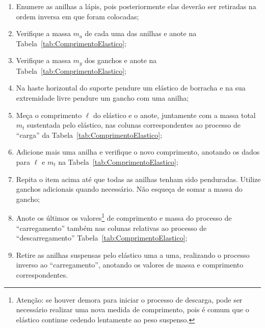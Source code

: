 \begin{enumerate}
    \item Enumere as anilhas a lápis, pois posteriormente elas deverão ser retiradas na ordem inversa em que foram colocadas;
	\item Verifique a massa $m_a$ de cada uma das anilhas e anote na Tabela~\ref{tab:ComprimentoElastico};
	\item Verifique a massa $m_g$ dos ganchos e anote na Tabela~\ref{tab:ComprimentoElastico};
	\item Na haste horizontal do suporte pendure um elástico de borracha e na sua extremidade livre pendure um gancho com uma anilha;
	\item Meça o comprimento $\ell$ do elástico e o anote, juntamente com a massa total $m_t$ sustentada pelo elástico, nas colunas correspondentes ao processo de ``carga'' da Tabela~\ref{tab:ComprimentoElastico};
	\item Adicione mais uma anilha e verifique o novo comprimento, anotando os dados para $\ell$ e $m_t$ na Tabela~\ref{tab:ComprimentoElastico};
	\item Repita o item acima até que todas as anilhas tenham sido penduradas. Utilize ganchos adicionais quando necessário. Não esqueça de somar a massa do gancho;
	\item Anote os últimos os valores\footnote{Atenção: se houver demora para iniciar o processo de descarga, pode ser necessário realizar uma nova medida de comprimento, pois é comum que o elástico continue cedendo lentamente ao peso suspenso.} de comprimento e massa do processo de ``carregamento'' também nas colunas relativas ao processo de ``descarregamento'' Tabela~\ref{tab:ComprimentoElastico};
	\item Retire as anilhas suspensas pelo elástico uma a uma, realizando o processo inverso ao ``carregamento'', anotando os valores de massa e comprimento correspondentes.
\end{enumerate}

\cleardoublepage


\vspace{15mm}

